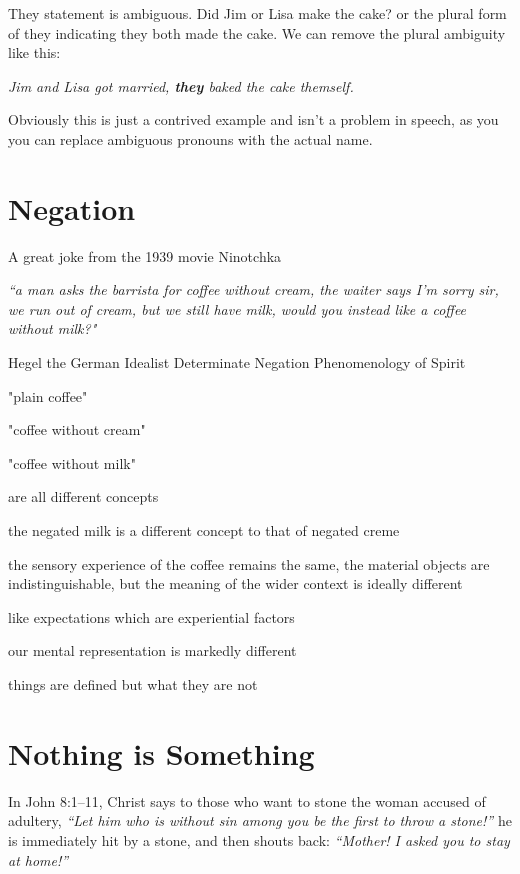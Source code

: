 They statement is ambiguous. Did Jim or Lisa make the cake? or the plural form of they indicating they both made the cake. We can remove the plural ambiguity like this:

\textit{Jim and Lisa got married, \textbf{they} baked the cake themself.}
 
Obviously this is just a contrived example and isn't a problem in speech, as you you can  replace ambiguous pronouns with the actual name.


\section{Negation}

A great joke from the 1939 movie Ninotchka

\textit{``a man asks the barrista for coffee without cream, the waiter says I'm sorry sir, we run out of cream, but we still have milk, would you instead like a coffee without milk?"}

Hegel the German Idealist
Determinate Negation
Phenomenology of Spirit

"plain coffee"

"coffee without cream"

"coffee without milk" 

are all different concepts

the negated milk is a different concept to that of negated creme

the sensory experience of the coffee remains the same, the material objects are indistinguishable, but the meaning of the wider context is ideally different 

like expectations which are experiential factors

our mental representation is markedly different

things are defined but what they are not


\section{Nothing is Something}

In John 8:1–11, Christ says to those who want to stone the woman accused of adultery, \textit{``Let him who is without sin among you be the first to throw a stone!''} he is immediately hit by a stone, and then shouts back: \textit{``Mother! I asked you to stay at home!''}

